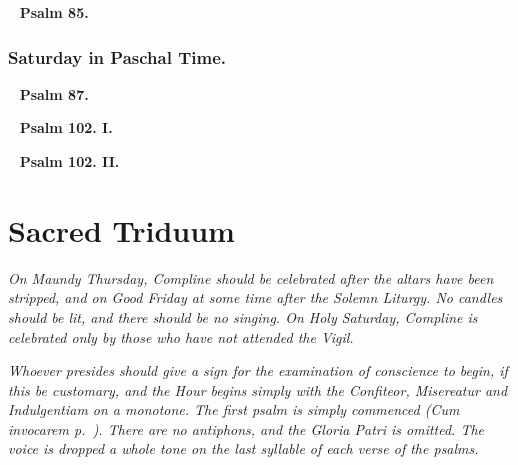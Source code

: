 \documentclass[a5paper,12pt,twoside,openany]{memoir}
\newcounter{versecount}
\def\startParallel{}
\def\stopParallel{}
\let\oldtextbf\textbf
\newcommand\rubrics[1]{\textit{#1}}
\newcommand\psalm[1]{~ \hfill \oldtextbf{Psalm #1.} \hfill ~}
\begin{document}
\setcounter{versecount}{1}
\startParallel

\stopParallel


\psalm{85}


\setcounter{versecount}{1}
\startParallel

\stopParallel




\subsection{Saturday in Paschal Time.}


\psalm{87}


\setcounter{versecount}{1}
\startParallel

\stopParallel


\psalm{102. I}


\setcounter{versecount}{1}
\startParallel

\stopParallel


\psalm{102. II}


\setcounter{versecount}{1}
\startParallel

\stopParallel



\setcounter{versecount}{0}


\chapter{Sacred Triduum}

\rubrics{On Maundy Thursday, Compline should be celebrated after the altars have been stripped, and on Good Friday at some time after the Solemn Liturgy.  No candles should be lit, and there should be no singing.  On Holy Saturday, Compline is celebrated only by those who have not attended the Vigil.}

\rubrics{Whoever presides should give a sign for the examination of conscience to begin, if this be customary, and the Hour begins simply with the Confiteor, Misereatur and Indulgentiam on a monotone.  The first psalm is simply commenced (Cum invocarem p.~\pageref{sunday}). There are no antiphons, and the Gloria Patri is omitted.  The voice is dropped a whole tone on the last syllable of each verse of the psalms.}
\end{document}
